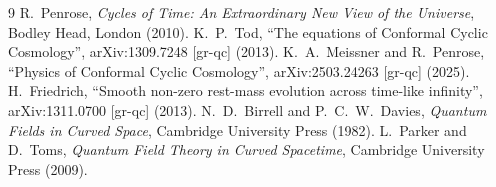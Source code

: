 \documentclass[11pt,a4paper]{article}
\theoremstyle{definition}
\begin{document}
\begin{thebibliography}{9}
 R.~Penrose, \emph{Cycles of Time: An Extraordinary New View of the Universe}, Bodley Head, London (2010).
 K.~P.~Tod, ``The equations of Conformal Cyclic Cosmology'', arXiv:1309.7248 [gr-qc] (2013).
 K.~A.~Meissner and R.~Penrose, ``Physics of Conformal Cyclic Cosmology'', arXiv:2503.24263 [gr-qc] (2025).
 H.~Friedrich, ``Smooth non-zero rest-mass evolution across time-like infinity'', arXiv:1311.0700 [gr-qc] (2013).
 N.~D.~Birrell and P.~C.~W.~Davies, \emph{Quantum Fields in Curved Space}, Cambridge University Press (1982).
 L.~Parker and D.~Toms, \emph{Quantum Field Theory in Curved Spacetime}, Cambridge University Press (2009).
\end{thebibliography}
\end{document}
